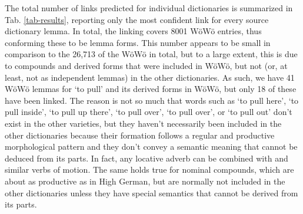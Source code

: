 The total number of links predicted for individual dictionaries is summarized in Tab. \ref{tab-results}, reporting only the most confident link for every source dictionary lemma.
In total, the linking covers 8001 WöWö entries, thus conforming these to be lemma forms. This number appears to be small in comparison to the 26,713 of the WöWö in total, but to a large extent, this is due to compounds and derived forms that were included in WöWö, but not (or, at least, not as independent lemmas) in the other dictionaries. As such, we have 41 WöWö lemmas for  `to pull' and its derived forms in WöWö, but only 18 of these have been linked. The reason is not so much that words such as  `to pull here',  `to pull inside',  `to pull up there',  `to pull over',  `to pull over', or  `to pull out' don't exist in the other varieties, but they haven't necessarily been included in the other dictionaries because their formation follows a regular and productive morphological pattern and they don't convey a semantic meaning that cannot be deduced from its parts. In fact, any locative adverb can be combined with  and similar verbs of motion. The same holds true for nominal compounds, which are about as productive as in High German, but are normally not included in the other dictionaries unless they have special semantics that cannot be derived from its parts.


